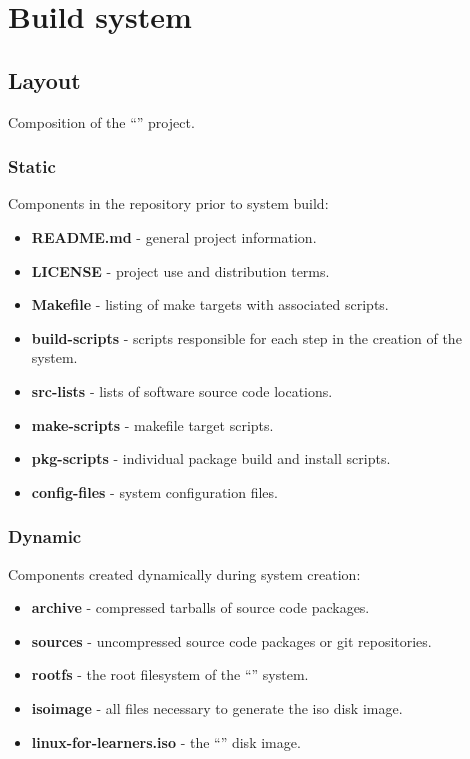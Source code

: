\section{Build system}\label{Build system}

\subsection{Layout}

Composition of the \enquote{} project.

\subsubsection{Static}

Components in the repository prior to system build:

\begin{itemize}
    \item \textbf{README.md} - general project information.
    \item \textbf{LICENSE} - project use and distribution terms.
    \item \textbf{Makefile} - listing of make targets with associated scripts.
    \item \textbf{build-scripts} - scripts responsible for each step in the creation of the system.
    \item \textbf{src-lists} - lists of software source code locations.
    \item \textbf{make-scripts} - makefile target scripts.
    \item \textbf{pkg-scripts} - individual package build and install scripts.
    \item \textbf{config-files} - system configuration files.
\end{itemize}

\subsubsection{Dynamic}

Components created dynamically during system creation:

\begin{itemize}
    \item \textbf{archive} - compressed tarballs of source code packages.
    \item \textbf{sources} - uncompressed source code packages or git repositories.
    \item \textbf{rootfs} - the root filesystem of the \enquote{} system.
    \item \textbf{isoimage} - all files necessary to generate the iso disk image.
    \item \textbf{linux-for-learners.iso} - the \enquote{} disk image.
\end{itemize}

